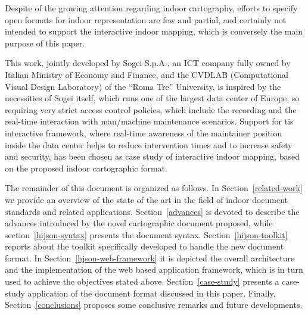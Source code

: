 Despite of the growing attention regarding indoor cartography, efforts to specify
open formats for indoor representation are few and partial, and certainly not
intended to support the interactive indoor mapping, which is conversely the
main purpose of this paper.

This work, jointly developed by Sogei S.p.A., an ICT company fully owned by
Italian  Ministry of Economy and Finance, and the CVDLAB (Computational Visual
Design Laboratory) of the ``Roma Tre'' University, is inspired by the
necessities of Sogei itself, which runs one of the largest data center of
Europe, so requiring very strict access control policies, which include the
recording and the real-time interaction with man/machine maintenance
scenarios. Support for tis interactive framework, where real-time awareness of
the maintainer position inside the data center helps to reduce intervention
times and to increase safety and security, has been chosen as case study of
interactive indoor mapping, based on the proposed indoor cartographic format.


The remainder of this document is organized as follows. In
Section~\ref{related-work} we provide an overview of the state of the art in
the field of indoor document standards and related applications.
Section~\ref{advances} is devoted to describe the advances introduced by the
novel cartographic document proposed, while section~\ref{hijson-syntax}
presents the document syntax. Section~\ref{hijson-toolkit} reports about the
toolkit specifically developed to handle the new document format. In
Section~\ref{hjson-web-framework} it is depicted the overall architecture and
the implementation of the web based application framework, which is in turn
used to achieve the objectives stated above. Section~\ref{case-study} presents
a case-study application of the document format discussed in this paper.
Finally, Section~\ref{conclusions} proposes some conclusive remarks and future
developments.


